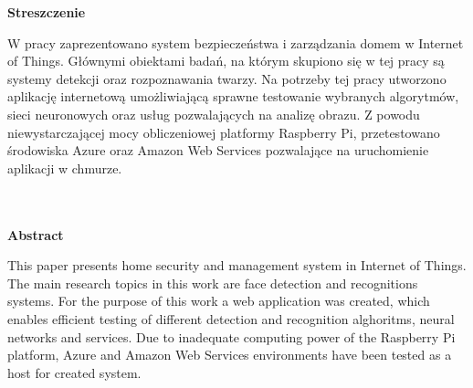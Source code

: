 \vspace*{\fill}
\begin{center}
{\centering \Huge \bfseries Streszczenie}\\
\end{center}
W pracy zaprezentowano system bezpieczeństwa i zarządzania domem w Internet of Things. Głównymi obiektami badań, na którym skupiono się w tej pracy są systemy detekcji oraz rozpoznawania twarzy. Na potrzeby tej pracy utworzono aplikację internetową umożliwiającą sprawne testowanie wybranych algorytmów, sieci neuronowych oraz usług pozwalających na analizę obrazu. Z powodu niewystarczającej mocy obliczeniowej platformy Raspberry Pi, przetestowano środowiska Azure oraz Amazon Web Services pozwalające na uruchomienie aplikacji w chmurze.
\\
\\
\\
\begin{center}
 {\Huge \bfseries  Abstract}\\
\end{center}
This paper presents home security and management system in Internet of Things. The main research topics in this work are face detection and recognitions systems. For the purpose of this work a web application was created, which enables efficient testing of different detection and recognition alghoritms, neural networks and services. Due to inadequate computing power of the Raspberry Pi platform, Azure and Amazon Web Services environments have been tested as a host for created system.
\\
\\
\\
\\
\\
\\
\\
\\
\\
\vspace*{\fill}